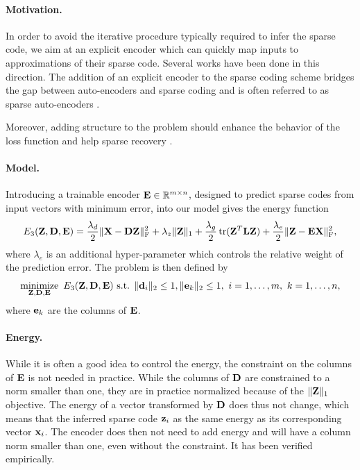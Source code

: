 \paragraph{Motivation.}
In order to avoid the iterative procedure typically required to infer the sparse code, we aim at an explicit encoder which can quickly map inputs to approximations of their sparse code. Several works \cite{lecun2010PSD, lecun2010LISTA, lecun2013DrSAE} have been done in this direction. The addition of an explicit encoder to the sparse coding scheme bridges the gap between auto-encoders and sparse coding and is often referred to as sparse auto-encoders \cite{bengio2009learningDeepAI}.

Moreover, adding structure to the problem should enhance the behavior of the loss function and help sparse recovery \cite{kowalski2009sparse, baraniuk2010modelCS, huang2011LearningStructuredSparsity, jenatton2011structured}.

\paragraph{Model.}
Introducing a trainable encoder $\mathbf{E} \in \mathbb{R}^{m \times n}$, designed to predict sparse codes from input vectors with minimum error, into our model gives the energy function
\begin{equation}\label{eqn:en_encoder}
	\Ethree = \frac{\lambda_d}{2} \normF{\X - \D \Z} + \lambda_z \normO{\Z} + \frac{\lambda_g}{2} \tr(\Z^T \L \Z) + \frac{\lambda_e}{2} \normF{\Z - \E \X}, %
\end{equation}
where $\lambda_e$ is an additional hyper-parameter which controls the relative weight of the prediction error. The problem is then defined by
\begin{equation}\label{eqn:pr_encoder}
	\operatorname*{minimize}\limits_{\mathbf{Z},\mathbf{D},\mathbf{E}} \  E_3(\mathbf{Z}, \mathbf{D}, \mathbf{E}) \text{ s.t. } \|\mathbf{d}_i\|_2 \leq 1 , \|\mathbf{e}_k\|_2 \leq 1 ,
	\ i = 1, \ldots, m , \ k = 1, \ldots, n,
\end{equation}
where $\mathbf{e}_k$ are the columns of $\mathbf{E}$. %

\paragraph{Energy.}
While it is often a good idea to control the energy, the constraint on the columns of $\mathbf{E}$ is not needed in practice. While the columns of $\mathbf{D}$ are constrained to a norm smaller than one, they are in practice normalized because of the $\| \mathbf{Z} \|_1$ objective. The energy of a vector transformed by $\mathbf{D}$ does thus not change, which means that the inferred sparse code $\mathbf{z}_i$ as the same energy as its corresponding vector $\mathbf{x}_i$. The encoder does then not need to add energy and will have a column norm smaller than one, even without the constraint. It has been verified empirically.

